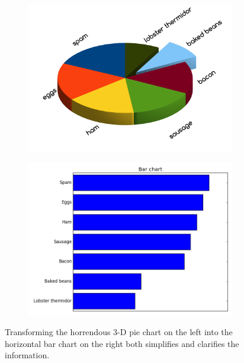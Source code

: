 \begin{figure}[H] %
\centering
\begin{subfigure}{.495\textwidth}
    \centering
    \includegraphics[width=\textwidth]{bad_pie_chart.png}
\end{subfigure}
%
\begin{subfigure}{.495\textwidth}
    \centering
    \includegraphics[width=\textwidth]{bar_chart_horizontal_sorted.png}
\end{subfigure}
\caption{Transforming the horrendous 3-D pie chart on the left into the horizontal bar chart on the right both simplifies and clarifies the information.}
\label{fig:pievsbar}
\end{figure}


